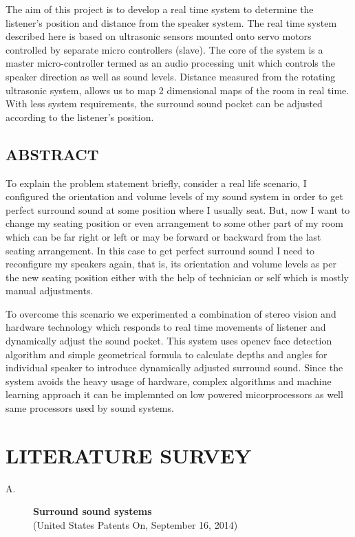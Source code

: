 \documentclass[twocolumn]{report}
\begin{document}
The aim of this project is to develop a real time system to 
determine the listener’s position and distance from the speaker 
system. The real time system described here is based on 
ultrasonic sensors mounted onto servo motors controlled by 
separate micro controllers (slave). The core of the system
is a master micro-controller termed as an audio processing 
unit which controls the speaker direction as well as sound levels. 
Distance measured from the rotating ultrasonic system, allows us 
to map 2 dimensional maps of the room in real time. With less 
system requirements, the surround sound pocket can be
adjusted according to the listener's position.

\section{ABSTRACT}

To explain the problem statement briefly, 
consider a real life scenario, I configured the 
orientation and volume levels of my sound system in 
order to get perfect surround sound at some 
position where I usually seat. But, now I want 
to change my seating position or even arrangement 
to some other part of my room which can be far 
right or left or may  be forward  or backward 
from the last seating arrangement. In this case 
to get perfect surround  sound I need to 
reconfigure my speakers again, that is, its 
orientation and volume levels as per the new 
seating position either with the help of technician 
or self which is mostly manual adjustments.

To overcome this scenario we experimented a combination of 
stereo vision and hardware technology which responds to real time
movements of listener and dynamically adjust the sound pocket. This system
uses opencv face detection algorithm and simple geometrical formula to
calculate depths and angles for individual speaker to introduce dynamically
adjusted surround sound. Since the system avoids the heavy usage of hardware, complex
algorithms and machine learning approach it can be implemnted on low powered
micorprocessors as well same processors used by sound systems.

\chapter{LITERATURE SURVEY}

\begin{description}
    \item[A.]\textbf{Surround sound systems}\\(United States Patents On, September 16, 2014)
\end{description}
\end{document}

